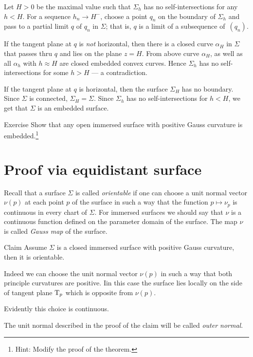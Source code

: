 Let $H>0$ be the maximal value such that $\Sigma_h$ has no self-intersections for any $h<H$.
For a sequence $h_n\to H^-$, choose a point $q_n$ on the boundary of $\Sigma_h$ and pass to a partial limit $q$ of $q_n$ in $\Sigma$;
that is, $q$ is a limit of a subsequence of~$(q_n)$.

If the tangent plane at $q$ is \emph{not} horizontal, 
then there is a closed curve $\alpha_H$ in $\Sigma$ that passes thru $q$ and lies on the plane $z=H$.
From above curve $\alpha_H$, as well as all $\alpha_h$ with $h\approx H$ are closed embedded convex curves.
Hence $\Sigma_h$ has no self-intersections for some $h>H$ --- a contradiction.

If the tangent plane at $q$ is horizontal,
then the surface $\Sigma_H$ has no boundary.
Since $\Sigma$ is connected, $\Sigma_H=\Sigma$.
Since $\Sigma_h$ has no self-intersections for $h<H$, we get that $\Sigma$ is an embedded surface.
\qeds

\begin{thm}{Exercise}
Show that any open immersed surface with positive Gauss curvature is embedded.\footnote{Hint: Modify the proof of the theorem.}
\end{thm}

\section{Proof via equidistant surface}

Recall that a surface $\Sigma$ is called \emph{orientable} if one can choose a unit normal vector $\nu(p)$ at each point $p$ of the surface in such a way that the function $p\mapsto \nu_p$ is continuous in every chart of $\Sigma$.
For immersed surfaces we should say that $\nu$ is a continuous function defined on the parameter domain of the surface.
The map $\nu$ is called \emph{Gauss map} of the surface.

\begin{thm}{Claim}
Assume $\Sigma$ is a closed immersed surface with positive Gauss curvature, then it is orientable.
\end{thm}


 Indeed we can choose the unit normal vector $\nu(p)$ in such a way that both principle curvatures are positive. 
Iin this case the surface lies locally on the side of tangent plane $\mathrm{T}_p$ which is opposite from $\nu(p)$.

Evidently this choice is  continuous.
\qeds

The unit normal described in the proof of the claim will be called \emph{outer normal}.

